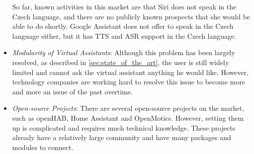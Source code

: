 \begin{itemize}
    So far, known activities in this market are that Siri does not speak in the Czech language, and there are no publicly known prospects that she would be able to do shortly. Google Assistant does not offer to speak in the Czech language either, but it has TTS and ASR support in the Czech language.
    \item \textit{Modularity of Virtual Assistants}:
    Although this problem has been largely resolved, as described in \cref{sec:state_of_the_art}, the user is still widely limited and cannot ask the virtual assistant anything he would like. However, technology companies are working hard to resolve this issue to become more and more an issue of the past overtime.
    \item \textit{Open-source Projects}:
    There are several open-source projects on the market, such as openHAB, Home Assistant and OpenMotics. However, setting them up is complicated and requires much technical knowledge. These projects already have a relatively large community and have many packages and modules to connect.
\end{itemize}



